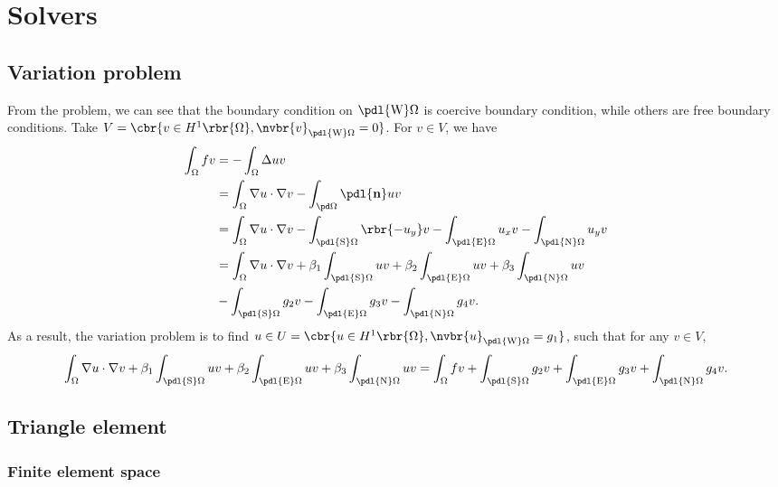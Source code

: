 \documentclass[english, nochinese]{pnote}
\begin{document}
\section{Solvers}

\subsection{Variation problem}

From the problem, we can see that the boundary condition on $ \pdl{\text{W}} \Omega $ is coercive boundary condition, while others are free boundary conditions. Take $ V = \cbr{ v \in H^1 \rbr{\Omega}, \nvbr{v}_{ \pdl{\text{W}} \Omega } = 0 } $. For $ v \in V $, we have
\begin{equation}
\begin{split}
\int_{\Omega} f v &= -\int_{\Omega} \Delta u v \\
&= \int_{\Omega} \nabla u \cdot \nabla v - \int_{ \pd \Omega } \pdl{\mathbf{n}} u v \\
&= \int_{\Omega} \nabla u \cdot \nabla v - \int_{ \pdl{\text{S}} \Omega } \rbr{-u_y} v - \int_{ \pdl{\text{E}} \Omega } u_x v - \int_{ \pdl{\text{N}} \Omega } u_y v \\
&= \int_{\Omega} \nabla u \cdot \nabla v + \beta_1 \int_{ \pdl{\text{S}} \Omega } u v + \beta_2 \int_{ \pdl{\text{E}} \Omega } u v + \beta_3 \int_{ \pdl{\text{N}} \Omega } u v \\
&- \int_{ \pdl{\text{S}} \Omega } g_2 v - \int_{ \pdl{\text{E}} \Omega } g_3 v - \int_{ \pdl{\text{N}} \Omega } g_4 v.
\end{split}
\end{equation}
As a result, the variation problem is to find $ u \in U = \cbr{ u \in H^1 \rbr{\Omega}, \nvbr{u}_{ \pdl{\text{W}} \Omega } = g_1 } $, such that for any $ v \in V $,
\begin{equation}
\int_{\Omega} \nabla u \cdot \nabla v + \beta_1 \int_{ \pdl{\text{S}} \Omega } u v + \beta_2 \int_{ \pdl{\text{E}} \Omega } u v + \beta_3 \int_{ \pdl{\text{N}} \Omega } u v = \int_{\Omega} f v + \int_{ \pdl{\text{S}} \Omega } g_2 v + \int_{ \pdl{\text{E}} \Omega } g_3 v + \int_{ \pdl{\text{N}} \Omega } g_4 v.
\end{equation}

\subsection{Triangle element}

\subsubsection{Finite element space}
\end{document}
